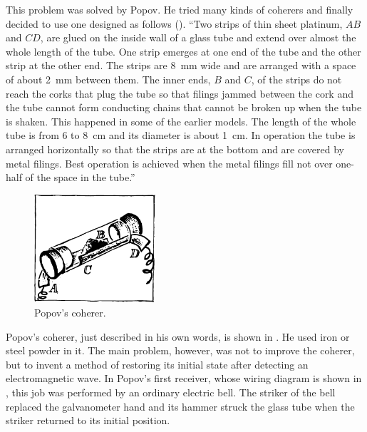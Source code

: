 This problem was solved by Popov. He tried many kinds of coherers and finally decided to use one designed as follows (). ``Two strips of thin sheet platinum, $AB$ and $CD$, are glued on the inside wall of a glass tube and extend over almost the whole length of the tube. One strip emerges at one end of the tube and the other strip at the other end. The strips are \SI{8}{\milli\meter} wide and are arranged with a space of about \SI{2}{\milli\meter} between them. The inner ends, $B$ and $C$, of the strips do not reach the corks that plug the tube so that filings jammed between the cork and the tube cannot form conducting chains that cannot be broken up when the tube is shaken. This happened in some of the earlier models. The length of the whole tube is from 6 to \SI{8}{\centi\meter} and its diameter is about \SI{1}{\centi\meter}. In operation the tube is arranged horizontally so that the strips are at the bottom and are covered by metal filings. Best operation is achieved when the metal filings fill not over one-half of the space in the tube.''


\begin{figure}[!ht]
\centering
\includegraphics[width=0.4\textwidth]{figures/fig-06-01.pdf}
\caption{Popov's coherer.}
\label{fig-6.1}
\end{figure}

Popov's coherer, just described in his own words, is shown in . He used iron or steel powder in it. The main problem, however, was not to improve the
coherer, but to invent a method of restoring its initial state after detecting an electromagnetic wave. In Popov's first receiver, whose wiring diagram is shown in , this job was performed by an ordinary electric bell. The striker of the bell replaced the galvanometer hand and its hammer struck the glass tube when the striker returned to its initial position.

